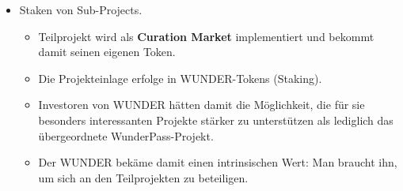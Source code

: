 
\begin{itemize}
  \item Staken von Sub-Projects. 
  \begin{itemize}
  	\item Teilprojekt wird als \textbf{Curation Market} implementiert und bekommt damit seinen eigenen Token.
  	\item Die Projekteinlage erfolge in WUNDER-Tokens (Staking).
  	\item Investoren von WUNDER hätten damit die Möglichkeit, die für sie besonders interessanten Projekte stärker zu unterstützen als lediglich das übergeordnete WunderPass-Projekt.
  	\item Der WUNDER bekäme damit einen intrinsischen Wert: Man braucht ihn, um sich an den Teilprojekten zu beteiligen.
  \end{itemize}
\end{itemize}

\vspace{0.5cm}
